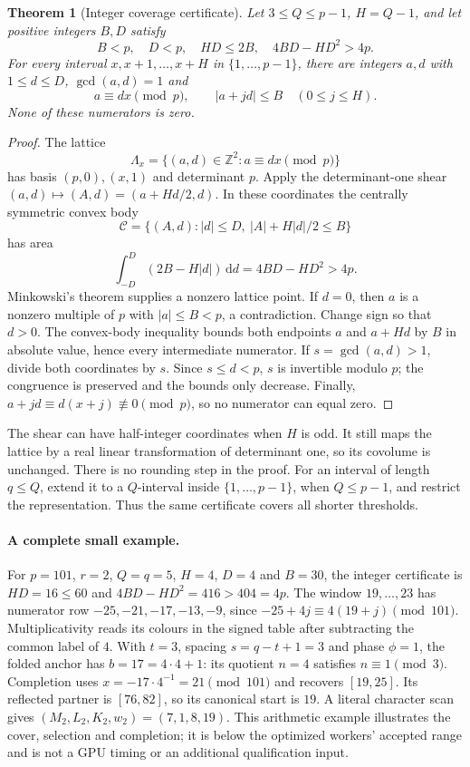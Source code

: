 \documentclass[11pt]{article}
\newtheorem{theorem}{Theorem}[section]
\theoremstyle{definition}\newtheorem{remark}[theorem]{Remark}
\newcommand{\Z}{\mathbb Z}
\begin{document}
\begin{theorem}[Integer coverage certificate]\label{thm:cover}
Let $3\le Q\le p-1$, $H=Q-1$, and let positive integers $B,D$ satisfy
\begin{equation}\label{eq:certificate}
 B<p,\quad D<p,\quad HD\le2B,\quad 4BD-HD^2>4p.
\end{equation}
For every interval $x,x+1,\ldots,x+H$ in $\{1,\ldots,p-1\}$, there are
integers $a,d$ with $1\le d\le D$, $\gcd(a,d)=1$ and
\[
 a\equiv dx\pmod p,\qquad |a+jd|\le B\quad(0\le j\le H).
\]
None of these numerators is zero.
\end{theorem}
\begin{proof}
The lattice
\[
 \Lambda_x=\{(a,d)\in\Z^2:a\equiv dx\pmod p\}
\]
has basis $(p,0),(x,1)$ and determinant $p$. Apply the determinant-one
shear $(a,d)\mapsto(A,d)=(a+Hd/2,d)$. In these coordinates the centrally
symmetric convex body
\[
 \mathcal C=\{(A,d):|d|\le D,\ |A|+H|d|/2\le B\}
\]
has area
\[
 \int_{-D}^{D}(2B-H|d|)\,\mathrm d d=4BD-HD^2>4p.
\]
Minkowski's theorem supplies a nonzero lattice point. If $d=0$, then
$a$ is a nonzero multiple of $p$ with $|a|\le B<p$, a contradiction.
Change sign so that $d>0$. The convex-body inequality bounds both endpoints
$a$ and $a+Hd$ by $B$ in absolute value, hence every intermediate numerator.
If $s=\gcd(a,d)>1$, divide both coordinates by $s$. Since $s\le d<p$,
$s$ is invertible modulo $p$; the congruence is preserved and the bounds
only decrease. Finally, $a+jd\equiv d(x+j)\not\equiv0\pmod p$, so no
numerator can equal zero.
\end{proof}

The shear can have half-integer coordinates when $H$ is odd. It still maps
the lattice by a real linear transformation of determinant one, so its
covolume is unchanged. There is no rounding step in the proof.
For an interval of length $q\le Q$, extend it to a $Q$-interval inside
$\{1,\ldots,p-1\}$, when $Q\le p-1$, and restrict the representation.
Thus the same certificate covers all shorter thresholds.

\paragraph{A complete small example.}
For $p=101$, $r=2$, $Q=q=5$, $H=4$, $D=4$ and $B=30$, the
integer certificate is $HD=16\le60$ and
$4BD-HD^2=416>404=4p$. The window $19,\ldots,23$ has numerator
row $-25,-21,-17,-13,-9$, since $-25+4j\equiv4(19+j)\pmod{101}$.
Multiplicativity reads its colours in the signed table after subtracting
the common label of $4$. With $t=3$, spacing $s=q-t+1=3$ and phase
$\phi=1$, the folded anchor has $b=17=4\cdot4+1$: its quotient
$n=4$ satisfies $n\equiv1\pmod3$. Completion uses
$x=-17\cdot4^{-1}=21\pmod{101}$ and recovers $[19,25]$.
Its reflected partner is $[76,82]$, so its canonical start is $19$.
A literal character scan gives $(M_2,L_2,K_2,w_2)=(7,1,8,19)$.
This arithmetic example illustrates the cover, selection and completion;
it is below the optimized workers' accepted range and is not a GPU timing
or an additional qualification input.
\end{document}
